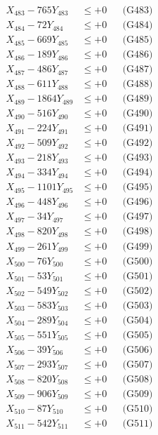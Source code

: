 \documentclass[a4paper,10pt]{article}
\begin{document}
{\begin{align}
X_{483} - 765Y_{483} &\leq +0 && \text{(G483)} \\
X_{484} - 72Y_{484} &\leq +0 && \text{(G484)} \\
X_{485} - 669Y_{485} &\leq +0 && \text{(G485)} \\
X_{486} - 189Y_{486} &\leq +0 && \text{(G486)} \\
X_{487} - 486Y_{487} &\leq +0 && \text{(G487)} \\
X_{488} - 611Y_{488} &\leq +0 && \text{(G488)} \\
X_{489} - 1864Y_{489} &\leq +0 && \text{(G489)} \\
X_{490} - 516Y_{490} &\leq +0 && \text{(G490)} \\
\allowbreak
X_{491} - 224Y_{491} &\leq +0 && \text{(G491)} \\
X_{492} - 509Y_{492} &\leq +0 && \text{(G492)} \\
X_{493} - 218Y_{493} &\leq +0 && \text{(G493)} \\
X_{494} - 334Y_{494} &\leq +0 && \text{(G494)} \\
X_{495} - 1101Y_{495} &\leq +0 && \text{(G495)} \\
X_{496} - 448Y_{496} &\leq +0 && \text{(G496)} \\
X_{497} - 34Y_{497} &\leq +0 && \text{(G497)} \\
X_{498} - 820Y_{498} &\leq +0 && \text{(G498)} \\
X_{499} - 261Y_{499} &\leq +0 && \text{(G499)} \\
X_{500} - 76Y_{500} &\leq +0 && \text{(G500)} \\
\allowbreak
X_{501} - 53Y_{501} &\leq +0 && \text{(G501)} \\
X_{502} - 549Y_{502} &\leq +0 && \text{(G502)} \\
X_{503} - 583Y_{503} &\leq +0 && \text{(G503)} \\
X_{504} - 289Y_{504} &\leq +0 && \text{(G504)} \\
X_{505} - 551Y_{505} &\leq +0 && \text{(G505)} \\
X_{506} - 39Y_{506} &\leq +0 && \text{(G506)} \\
X_{507} - 293Y_{507} &\leq +0 && \text{(G507)} \\
X_{508} - 820Y_{508} &\leq +0 && \text{(G508)} \\
X_{509} - 906Y_{509} &\leq +0 && \text{(G509)} \\
X_{510} - 87Y_{510} &\leq +0 && \text{(G510)} \\
\allowbreak
X_{511} - 542Y_{511} &\leq +0 && \text{(G511)} \\

\end{align}}
\end{document}
